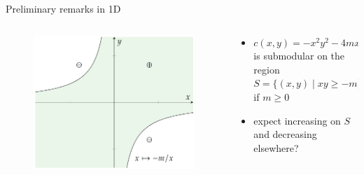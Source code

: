 \documentclass[9pt,xcolor={dvipsnames}]{beamer}
\begin{document}
\begin{frame}{Preliminary remarks in 1D}
    \begin{columns}
        \begin{column}[t]{.5\textwidth}
            \begin{figure}
                \centering
                \includegraphics[width=\textwidth]{figures/submod.png}
                \label{fig:submod}
            \end{figure}
        \end{column}
        \begin{column}[t]{.5\textwidth}
            \begin{itemize}
                \item $c(x,y)=-x^2y^2-4mxy$ is submodular on the region $S=\{(x,y)\mid xy\geq -m \}$ if $m\geq0$
                \vspace{1cm}
                \item expect increasing on $S$ and decreasing elsewhere?
            \end{itemize}
        \end{column}
    \end{columns}
\end{frame}
\end{document}
